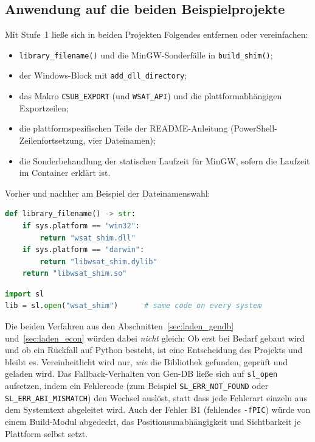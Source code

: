 \subsection{Anwendung auf die beiden Beispielprojekte}
\label{sec:sl_anwendung}

Mit Stufe~1 ließe sich in beiden Projekten Folgendes entfernen oder vereinfachen:

\begin{itemize}
	\item \texttt{library\_filename()} und die MinGW-Sonderfälle in \texttt{build\_shim()};
	\item der Windows-Block mit \texttt{add\_dll\_directory};
	\item das Makro \texttt{CSUB\_EXPORT} (und \texttt{WSAT\_API}) und die plattformabhängigen Exportzeilen;
	\item die plattformspezifischen Teile der README-Anleitung (PowerShell-Zeilenfortsetzung, vier Dateinamen);
	\item die Sonderbehandlung der statischen Laufzeit für MinGW, sofern die Laufzeit im Container erklärt ist.
\end{itemize}

Vorher und nachher am Beispiel der Dateinamenswahl:

\begin{lstlisting}[language=Python, caption={Vorher: Dateiname je Plattform (aus \texttt{native.py}, subgraph-sat-solver-econ)}, label={lst:sl_vorher}]
def library_filename() -> str:
    if sys.platform == "win32":
        return "wsat_shim.dll"
    if sys.platform == "darwin":
        return "libwsat_shim.dylib"
    return "libwsat_shim.so"
\end{lstlisting}

\begin{lstlisting}[language=Python, caption={Nachher: dasselbe mit dem Standardlader (Entwurf)}]
import sl
lib = sl.open("wsat_shim")      # same code on every system
\end{lstlisting}

Die beiden Verfahren aus den Abschnitten~\ref{sec:laden_gendb} und~\ref{sec:laden_econ} würden dabei \emph{nicht} gleich: Ob erst bei Bedarf gebaut wird und ob ein Rückfall auf Python besteht, ist eine Entscheidung des Projekts und bleibt es. Vereinheitlicht wird nur, \emph{wie} die Bibliothek gefunden, geprüft und geladen wird. Das Fallback-Verhalten von Gen-DB ließe sich auf \texttt{sl\_open} aufsetzen, indem ein Fehlercode (zum Beispiel \texttt{SL\_ERR\_NOT\_FOUND} oder \texttt{SL\_ERR\_ABI\_MISMATCH}) den Wechsel auslöst, statt dass jede Fehlerart einzeln aus dem Systemtext abgeleitet wird. Auch der Fehler B1 (fehlendes \texttt{-fPIC}) würde von einem Build-Modul abgedeckt, das Positionsunabhängigkeit und Sichtbarkeit je Plattform selbst setzt.


